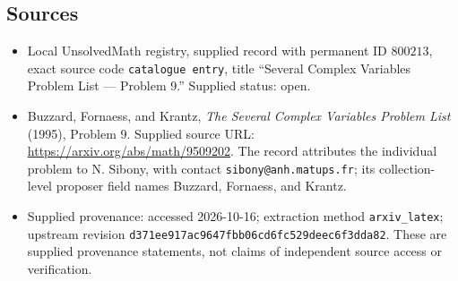 \documentclass[11pt]{article}
\begin{document}
\subsection{Sources}
\begin{itemize}
\item Local UnsolvedMath registry, supplied record with permanent ID \(800213\), exact source code \texttt{catalogue entry}, title ``Several Complex Variables Problem List --- Problem 9.'' Supplied status: open.
\item Buzzard, Fornaess, and Krantz, \emph{The Several Complex Variables Problem List} (1995), Problem 9. Supplied source URL: \url{https://arxiv.org/abs/math/9509202}. The record attributes the individual problem to N. Sibony, with contact \texttt{sibony@anh.matups.fr}; its collection-level proposer field names Buzzard, Fornaess, and Krantz.
\item Supplied provenance: accessed 2026-10-16; extraction method \texttt{arxiv\_latex}; upstream revision \texttt{d371ee917ac9647fbb06cd6fc529deec6f3dda82}. These are supplied provenance statements, not claims of independent source access or verification.
\end{itemize}
\end{document}
